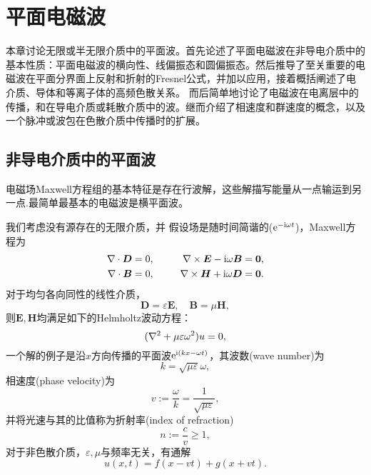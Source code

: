 \chapter{平面电磁波}
\label{chap:plane wave}
本章讨论无限或半无限介质中的平面波。首先论述了平面电磁波在非导电介质中的基本性质：平面电磁波的横向性、线偏振态和圆偏振态。然后推导了至关重要的电磁波在平面分界面上反射和折射的Fresnel公式，并加以应用，接着概括阐述了电介质、导体和等离子体的高频色散关系。%
而后简单地讨论了电磁波在电离层中的传播，和在导电介质或耗散介质中的波。继而介绍了相速度和群速度的概念，以及一个脉冲或波包在色散介质中传播时的扩展。%
\section{非导电介质中的平面波}
电磁场Maxwell方程组的基本特征是存在行波解，这些解描写能量从一点输运到另一点.最简单最基本的电磁波是横平面波。%
\iffalse
当没有源存在时，无限介质中的Maxwell方程组是：
\begin{alignat*}{2}
    \div\bm D&=0,&\qquad\curl\bm E+\pv{\bm B}t&=\bm 0,\\
    \div\bm B&=0,&\curl\bm H-\pv{\bm D}t&=\bm 0.    
\end{alignat*}
\fi

我们考虑没有源存在的无限介质，并
假设场是随时间简谐的($\mathop{}\!\mathrm{e}^{-\mathrm{i}\omega t}$)，Maxwell方程为
\begin{alignat*}{2}
    \nabla\cdot\bm D&=0,&\qquad\nabla\times\bm E-\mathrm{i}\omega\bm B&=\bm 0,\\
    \nabla\cdot\bm B&=0,&\nabla\times\bm H+\mathrm{i}\omega\bm D&=\bm 0.    
\end{alignat*}
对于均匀各向同性的线性介质，
\[
    \bm D=\varepsilon\bm E,\quad\bm B=\mu\bm H,
\]
则$\bm E,\bm H$均满足如下的Helmholtz波动方程：
\begin{equation}
    (\nabla^2+\mu\varepsilon\omega^2)u=0,
\end{equation}
一个解的例子是沿$x$方向传播的平面波$\mathop{}\!\mathrm{e}^{\mathrm{i}(kx-\omega t)}$，其波数(wave number)为
\[
    k=\sqrt{\mu\varepsilon}\omega,
\]
相速度(phase velocity)为
\begin{equation}
    v:=\frac{\omega}k=\frac1{\sqrt{\mu\varepsilon}},
\end{equation}
并将光速与其的比值称为折射率(index of refraction)
\begin{equation}
    n:=\frac cv\geqslant1,
\end{equation}
对于非色散介质，$\varepsilon,\mu$与频率无关，有通解
\[
    u(x,t)=f(x-vt)+g(x+vt).
\]
